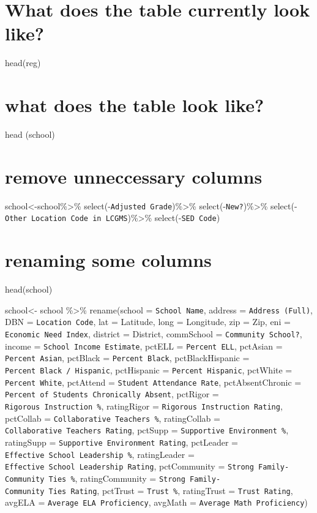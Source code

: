 \documentclass[]{article}
\begin{document}
\section{What does the table currently look
like?}\label{what-does-the-table-currently-look-like}

head(reg)

\section{what does the table look
like?}\label{what-does-the-table-look-like}

head (school)

\section{remove unneccessary columns}\label{remove-unneccessary-columns}

school\textless{}-school\%\textgreater{}\%
select(-\texttt{Adjusted\ Grade})\%\textgreater{}\%
select(-\texttt{New?})\%\textgreater{}\%
select(-\texttt{Other\ Location\ Code\ in\ LCGMS})\%\textgreater{}\%
select(-\texttt{SED\ Code})

\section{renaming some columns}\label{renaming-some-columns}

head(school)

school\textless{}- school \%\textgreater{}\% rename(school =
\texttt{School\ Name}, address = \texttt{Address\ (Full)}, DBN =
\texttt{Location\ Code}, lat = Latitude, long = Longitude, zip = Zip,
eni = \texttt{Economic\ Need\ Index}, district = District, commSchool =
\texttt{Community\ School?}, income = \texttt{School\ Income\ Estimate},
pctELL = \texttt{Percent\ ELL}, pctAsian = \texttt{Percent\ Asian},
pctBlack = \texttt{Percent\ Black}, pctBlackHispanic =
\texttt{Percent\ Black\ /\ Hispanic}, pctHispanic =
\texttt{Percent\ Hispanic}, pctWhite = \texttt{Percent\ White},
pctAttend = \texttt{Student\ Attendance\ Rate}, pctAbsentChronic =
\texttt{Percent\ of\ Students\ Chronically\ Absent}, pctRigor =
\texttt{Rigorous\ Instruction\ \%}, ratingRigor =
\texttt{Rigorous\ Instruction\ Rating}, pctCollab =
\texttt{Collaborative\ Teachers\ \%}, ratingCollab =
\texttt{Collaborative\ Teachers\ Rating}, pctSupp =
\texttt{Supportive\ Environment\ \%}, ratingSupp =
\texttt{Supportive\ Environment\ Rating}, pctLeader =
\texttt{Effective\ School\ Leadership\ \%}, ratingLeader =
\texttt{Effective\ School\ Leadership\ Rating}, pctCommunity =
\texttt{Strong\ Family-Community\ Ties\ \%}, ratingCommunity =
\texttt{Strong\ Family-Community\ Ties\ Rating}, pctTrust =
\texttt{Trust\ \%}, ratingTrust = \texttt{Trust\ Rating}, avgELA =
\texttt{Average\ ELA\ Proficiency}, avgMath =
\texttt{Average\ Math\ Proficiency})
\end{document}
